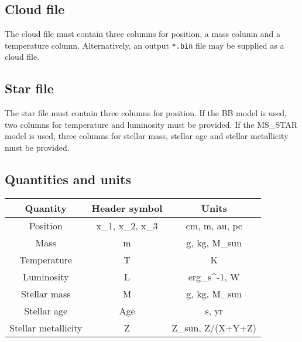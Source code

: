 \documentclass[11pt]{article}
\begin{document}
\subsection{Cloud file}

The cloud file must contain three columns for position, a mass column and a temperature column. Alternatively, an output \texttt{*.bin} file may be supplied as a cloud file.

\subsection{Star file}

The star file must contain three columns for position. If the BB model is used, two columns for temperature and luminosity must be provided. If the MS\_STAR model is used, three columns for stellar mass, stellar age and stellar metallicity must be provided.

\subsection{Quantities and units}
\label{units}

\begin{center}
	\begin{tabular}{|c|c|c|}
		\hline
		Quantity & Header symbol & Units \\
		\hline
		Position & x\_1, x\_2, x\_3 & cm, m, au, pc \\
		Mass &  m & g, kg, M\_sun \\
		Temperature & T & K \\
		Luminosity & L & erg\_s\^{}-1, W \\
		Stellar mass & M & g, kg, M\_sun \\
		Stellar age & Age & s, yr \\
		Stellar metallicity & Z & Z\_sun, Z/(X+Y+Z)\\
		\hline
	\end{tabular}
\end{center}







\end{document}
